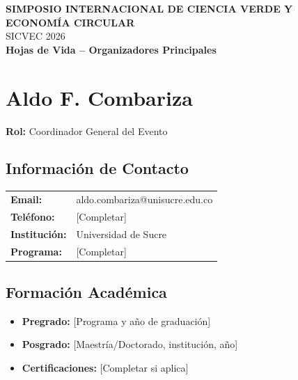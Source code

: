\documentclass[12pt,a4paper]{article}
\begin{document}

\thispagestyle{empty}

\begin{center}
{\Large\bfseries\color{verdeosc} SIMPOSIO INTERNACIONAL DE CIENCIA VERDE Y ECONOMÍA CIRCULAR}\\
{\normalsize\color{verdemid} SICVEC 2026}\\[0.5cm]
{\normalsize\bfseries Hojas de Vida -- Organizadores Principales}\\[1cm]
\end{center}

\newpage
\thispagestyle{fancy}

\section{Aldo F. Combariza}

\textbf{Rol:} Coordinador General del Evento

\subsection{Información de Contacto}

\begin{tabular}{ll}
\textbf{Email:} & aldo.combariza@unisucre.edu.co \\
\textbf{Teléfono:} & [Completar] \\
\textbf{Institución:} & Universidad de Sucre \\
\textbf{Programa:} & [Completar] \\
\end{tabular}

\subsection{Formación Académica}

\begin{itemize}[label={\textcolor{verdeosc}{\textbullet}}]
  \item \textbf{Pregrado:} [Programa y año de graduación]
  \item \textbf{Posgrado:} [Maestría/Doctorado, institución, año]
  \item \textbf{Certificaciones:} [Completar si aplica]
\end{itemize}
\end{document}
